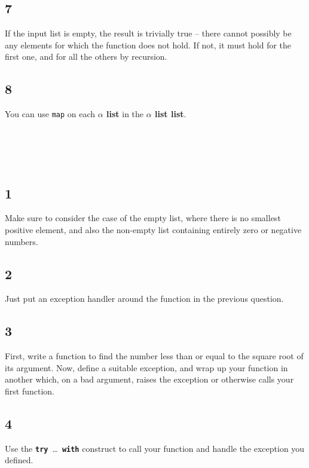 \documentclass[]{book}
\begin{document}
\begin{multicols*}{2}
\subsection*{7}
If the input list is empty, the result is trivially true -- there cannot possibly be any elements for which the function does not hold. If not, it must hold for the first one, and for all the others by recursion. 

\subsection*{8}
You can use \texttt{map} on each \textbf{\textsf{$\alpha$ list}} in the \textbf{\textsf{$\alpha$ list list}}.

\section*{\\ }

\subsection*{1}
Make sure to consider the case of the empty list, where there is no smallest positive element, and also the non-empty list containing entirely zero or negative numbers.

\subsection*{2}
Just put an exception handler around the function in the previous question.

\subsection*{3}
First, write a function to find the number less than or equal to the square root of its argument. Now, define a suitable exception, and wrap up your function in another which, on a bad argument, raises the exception or otherwise calls your first function.

\subsection*{4}
Use the \texttt{\textbf{try}}\ \ldots\ \texttt{\textbf{with}} construct to call your function and handle the exception you defined.

\section*{\\ }

\end{multicols*}
\end{document}
